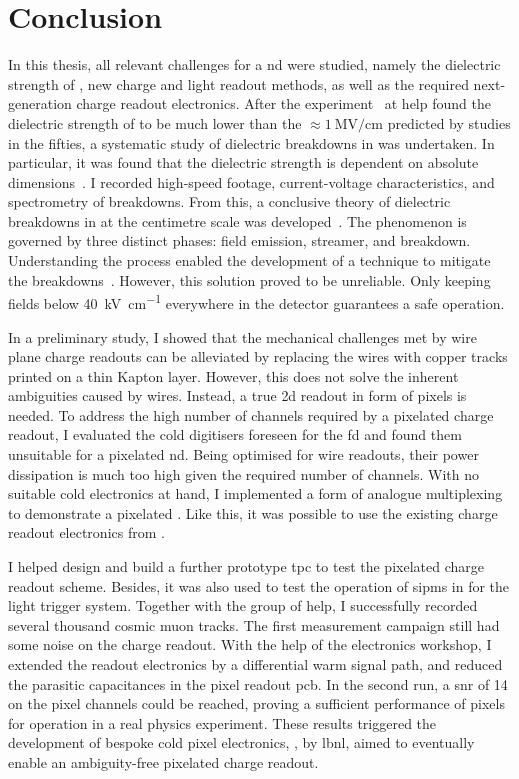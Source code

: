 \chapter{Conclusion}
\label{chap:conclusion}

In this thesis, all relevant challenges for a \gls{nd} \lartpc{} were studied, namely the dielectric strength of \lar{}, new charge and light readout methods, as well as the required next-generation charge readout electronics.
After the \AT{} experiment~\cite{AT} at \gls{help} found the dielectric strength of \lar{} to be much lower than the $\approx \SI{1}{\mega\volt\per\centi\metre}$ predicted by studies in the fifties, a systematic study of dielectric breakdowns in \lar{} was undertaken.
In particular, it was found that the dielectric strength is dependent on absolute dimensions~\cite{breakdown_14}.
I recorded high-speed footage, current-voltage characteristics, and spectrometry of breakdowns.
From this, a conclusive theory of dielectric breakdowns in \lar{} at the centimetre scale was developed~\cite{breakdown_14}.
The phenomenon is governed by three distinct phases: field emission, streamer, and breakdown.
Understanding the process enabled the development of a technique to mitigate the breakdowns~\cite{latex}.
However, this solution proved to be unreliable.
Only keeping fields below \SI{40}{\kilo\volt\per\centi\metre} everywhere in the detector guarantees a safe operation.

In a preliminary study, I showed that the mechanical challenges met by wire plane charge readouts can be alleviated by replacing the wires with copper tracks printed on a thin Kapton layer.
However, this does not solve the inherent ambiguities caused by wires.
Instead, a true \gls{2d} readout in form of pixels is needed.
To address the high number of channels required by a pixelated charge readout, I evaluated the cold digitisers foreseen for the \dune{} \gls{fd} and found them unsuitable for a pixelated \gls{nd}.
Being optimised for wire readouts, their power dissipation is much too high given the required number of channels.
With no suitable cold electronics at hand, I implemented a form of analogue multiplexing to demonstrate a pixelated \lartpc{}.
Like this, it was possible to use the existing charge readout electronics from \AT{}.

I helped design and build a further prototype \gls{tpc} to test the pixelated charge readout scheme.
Besides, it was also used to test the operation of \glspl{sipm} in \lar{} for the light trigger system.
Together with the \lar{} group of \gls{help}, I successfully recorded several thousand cosmic muon tracks.
The first measurement campaign still had some noise on the charge readout.
With the help of the electronics workshop, I extended the \AT{} readout electronics by a differential warm signal path, and reduced the parasitic capacitances in the pixel readout \gls{pcb}.
In the second run, a \gls{snr} of \num{14} on the pixel channels could be reached, proving a sufficient performance of pixels for operation in a real physics experiment.
These results triggered the development of bespoke cold pixel electronics, \larpix{}, by \gls{lbnl}, aimed to eventually enable an ambiguity-free pixelated \lartpc{} charge readout.

